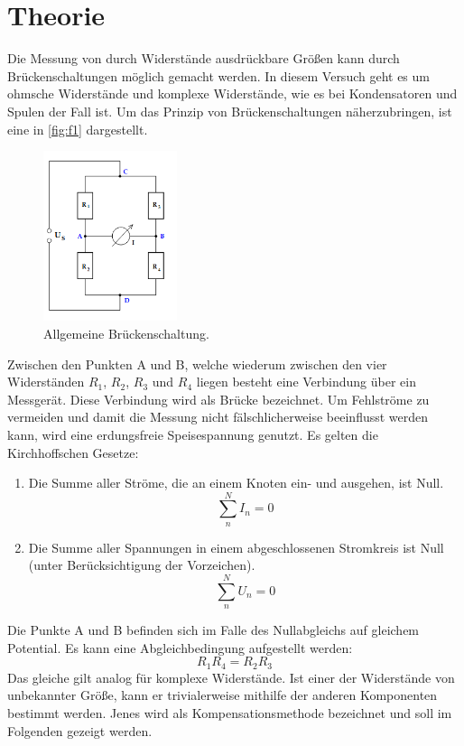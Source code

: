 \section{Theorie}
\label{sec:Theorie}

Die Messung von durch Widerstände ausdrückbare Größen kann durch Brückenschaltungen 
möglich gemacht werden. In diesem Versuch geht es um ohmsche Widerstände
und komplexe Widerstände, wie es bei Kondensatoren und Spulen der Fall ist.
Um das Prinzip von Brückenschaltungen näherzubringen, ist eine in \autoref{fig:f1}
dargestellt.
\begin{figure}[H]
    \centering
        \centering
        \includegraphics[width=0.35\textwidth]{Bilder/Brueckenschaltung.png}
        \caption{Allgemeine Brückenschaltung. \cite{anleitung}}
    \hfill
    \label{fig:f1}
\end{figure}
\noindent Zwischen den Punkten A und B, welche wiederum zwischen den vier Widerständen 
$R_1$, $R_2$, $R_3$ und $R_4$ liegen besteht eine Verbindung über ein Messgerät. 
Diese Verbindung wird als Brücke bezeichnet. Um Fehlströme zu vermeiden und damit 
die Messung nicht fälschlicherweise beeinflusst werden kann, wird eine erdungsfreie 
Speisespannung genutzt. Es gelten die Kirchhoffschen Gesetze:
\begin{enumerate}
    \item Die Summe aller Ströme, die an einem Knoten ein- und ausgehen, ist Null.
    \begin{equation}
        \sum\limits_{n}^N I_n = 0
    \end{equation}
    \item Die Summe aller Spannungen in einem abgeschlossenen Stromkreis ist Null 
    (unter Berücksichtigung der Vorzeichen).
    \begin{equation}
        \sum\limits_{n}^N U_n = 0
    \end{equation}
\end{enumerate}
\par\vspace{0.5em}
\noindent Die Punkte A und B befinden sich im Falle des Nullabgleichs auf
gleichem Potential. Es kann eine Abgleichbedingung aufgestellt werden:
\begin{equation}
    R_1 R_4 = R_2 R_3
\end{equation}
Das gleiche gilt analog für komplexe Widerstände. Ist einer der Widerstände 
von unbekannter Größe, kann er trivialerweise mithilfe der anderen Komponenten 
bestimmt werden. Jenes wird als Kompensationsmethode bezeichnet und soll im 
Folgenden gezeigt werden.

